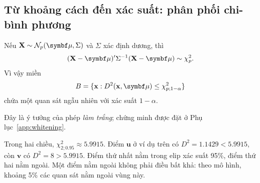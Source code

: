 \subsection{Từ khoảng cách đến xác suất: phân phối chi-bình phương}
\begin{result}
Nếu $\mathbf X\sim\N_p(\vmu,\Sigma)$ và $\Sigma$ xác định dương, thì
\begin{equation}
 (\mathbf X-\vmu)'\Sigma^{-1}(\mathbf X-\vmu)\sim\chi^2_p.
 \label{eq:chisqdistance}
\end{equation}
Vì vậy miền
\[
 B=\{\mathbf x:D^2(\mathbf x,\vmu)\le\chi^2_{p;1-\alpha}\}
\]
chứa một quan sát ngẫu nhiên với xác suất $1-\alpha$.
\end{result}

Đây là ý tưởng của phép \emph{làm trắng}; chứng minh được đặt ở
Phụ lục~\ref{app:whitening}.

\begin{example}
Trong hai chiều, $\chi^2_{2;0.95}\approx5.9915$.
Điểm $\mathbf u$ ở ví dụ trên có $D^2=1.1429<5.9915$, còn
$\mathbf v$ có $D^2=8>5.9915$. Điểm thứ nhất nằm trong elip xác suất 95\%,
điểm thứ hai nằm ngoài.
Một điểm nằm ngoài không phải điều bất khả: theo mô hình, khoảng 5\% các
quan sát nằm ngoài vùng này.
\end{example}


